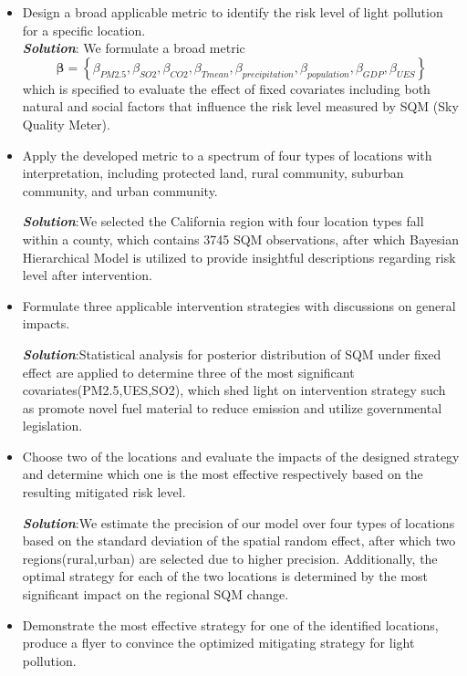 \documentclass{mcmthesis}
\begin{document}
\begin{itemize}
\item Design a broad applicable metric to identify the risk level of light pollution for a specific location.\\
\textbf{\emph{Solution}}: We formulate a broad metric 
$$
   \boldsymbol\beta = \left\{\beta_{PM2.5}, \beta_{SO2},\beta_{CO2},\beta_{Tmean},\beta_{precipitation},
\beta_{population},\beta_{GDP},\beta_{UES}\right\} 
$$
which is specified to evaluate the effect of fixed covariates including both natural and social factors that influence the risk level measured by SQM (Sky Quality Meter).
\item Apply the developed metric to a spectrum of four types of locations with interpretation, including protected land, rural community, suburban community, and urban community.

\textbf{\emph{Solution}}:We selected the California region with four location types fall within a county, which contains 3745 SQM observations, after which Bayesian Hierarchical Model is utilized to provide insightful descriptions regarding risk level after intervention.  

\item Formulate three applicable intervention strategies with discussions on general impacts.

\textbf{\emph{Solution}}:Statistical analysis for posterior distribution of SQM under fixed effect are applied to determine three of the most significant covariates(PM2.5,UES,SO2),
which shed light on intervention strategy such as promote novel fuel material to reduce emission and utilize governmental legislation.


\item Choose two of the locations and evaluate the impacts of the designed strategy and determine which one is the most effective respectively based on the resulting mitigated risk level.

\textbf{\emph{Solution}}:We estimate the precision of our model over four types of locations based on the standard deviation of the spatial random effect, after which two regions(rural,urban) are selected due to higher precision. Additionally, the optimal strategy for each of the two locations is determined by the most significant impact on the regional SQM change.

\item Demonstrate the most effective strategy for one of the identified locations, produce a flyer to convince the optimized mitigating strategy for light pollution.
\end{itemize}
\newpage
\end{document}
